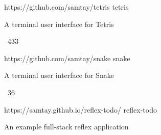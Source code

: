 \vspace{0.25em}
\begin{cvprojects}
  \cvproject
    {https://github.com/samtay/tetris}
    {tetris}
    {\begin{cvitems}
        \item A terminal user interface for Tetris
        \item {\color{graytext} \faStarO \, 433}
     \end{cvitems}}
  \cvproject
    {https://github.com/samtay/snake}
    {snake}
    {\begin{cvitems}
        \item A terminal user interface for Snake
        \item {\color{graytext} \faStarO \, 36}
     \end{cvitems}}
  \cvproject
    {https://samtay.github.io/reflex-todo/}
    {reflex-todo}
    {\begin{cvitems}
        \item An example full-stack reflex application
     \end{cvitems}}
\end{cvprojects}
